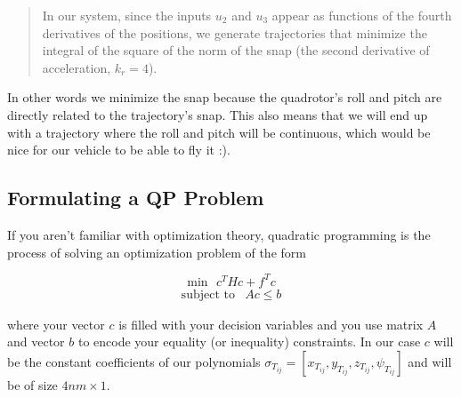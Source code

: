 \documentclass{article}
\begin{document}
\begin{quotation}
In our system, since the inputs $u_2$ and $u_3$ appear as functions of the fourth derivatives of the positions, we generate trajectories that minimize the integral of the square of the norm of the snap (the second derivative of acceleration, $k_r = 4$).
\end{quotation}

In other words we minimize the snap because the quadrotor's roll and pitch are directly related to the trajectory's snap. This also means that we will end up with a trajectory where the roll and pitch will be continuous, which would be nice for our vehicle to be able to fly it :).

\subsection{Formulating a QP Problem}
If you aren't familiar with optimization theory, quadratic programming is the process of solving an optimization problem of the form 

\[
\text{min}\ \ \ c^THc+f^Tc
\]\[
	\begin{array}{ll}
	\text{subject to} & Ac\leq b
	\end{array}
\]

where your vector $c$ is filled with your decision variables and you use matrix $A$ and vector $b$ to encode your equality (or inequality) constraints. In our case $c$ will be the constant coefficients of our polynomials $\sigma_{T_{ij}} = [x_{T_{ij}}, y_{T_{ij}}, z_{T_{ij}}, \psi_{T_{ij}}]$ and will be of size $4nm \times 1$.
\end{document}

